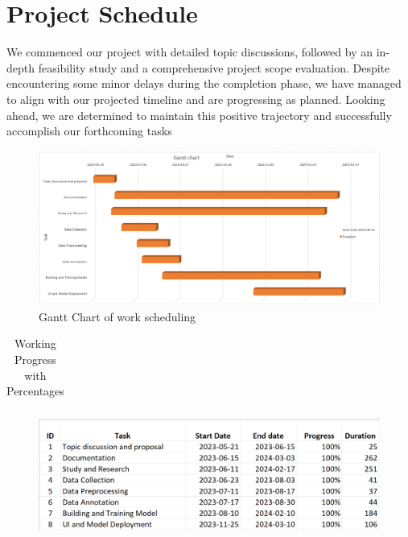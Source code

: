  \section{ Project Schedule}

 We commenced our project with detailed topic discussions, followed by an in-depth feasibility study and a comprehensive project scope evaluation. Despite encountering some minor delays during the completion phase, we have managed to align with our projected timeline and are progressing as planned. Looking ahead, we are determined to maintain this positive trajectory and successfully accomplish our forthcoming tasks


\begin{figure}[H]
\centering
\includegraphics [scale=0.75]{img/appendix/Gantt Chart of work scheduling.png}
 \caption[Gantt Chart of work scheduling]{Gantt Chart of work scheduling}

\end{figure}

 

\begin{table}[H]
  
\caption{ Working Progress with Percentages}
\label{tab:  Working Progress with Percentages}
    \centering
    
    \begin{tabular}{|c|c|c|}
    \end{tabular}
    
    
\end{table}


\begin{figure}[H]
\centering
\includegraphics [scale=0.59]{img/appendix/Working Progress with Percentages.png}

\end{figure}
 
   

 
